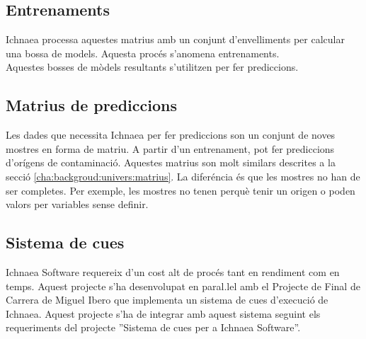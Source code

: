 \subsection{Entrenaments}
Ichnaea processa aquestes matrius amb un conjunt d'envelliments per calcular una bossa de models. Aquesta proc\'{e}s s'anomena entrenaments. \\
Aquestes bosses de m\`{o}dels resultants s'utilitzen per fer prediccions.

\subsection{Matrius de prediccions}
Les dades que necessita Ichnaea per fer prediccions son un conjunt de noves mostres en forma de matriu. A partir d'un entrenament, pot fer prediccions d'orígens de contaminaci\'{o}. Aquestes matrius son molt similars descrites a la secci\'{o} \ref{cha:backgroud:univers:matrius}. La difer\'{e}ncia \'{e}s que les mostres no han de ser completes. Per exemple, les mostres no tenen perquè tenir un origen o poden valors per variables sense definir.

\subsection{Sistema de cues}
Ichnaea Software requereix d'un cost alt de proc\'{e}s tant en rendiment com en temps. Aquest projecte s'ha desenvolupat en paral.lel amb el Projecte de Final de Carrera de Miguel Ibero que implementa un sistema de cues d'execuci\'{o} de Ichnaea. Aquest projecte s'ha de integrar amb aquest sistema seguint els requeriments del projecte ''Sistema de cues per a Ichnaea Software''.